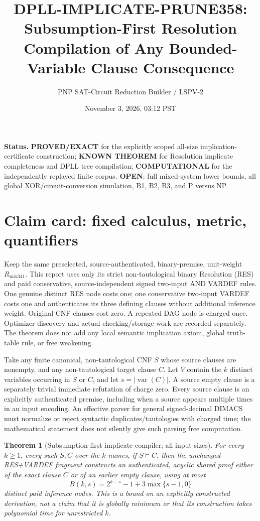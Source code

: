 \documentclass[11pt]{article}
\title{DPLL-IMPLICATE-PRUNE358: Subsumption-First Resolution Compilation of Any Bounded-Variable Clause Consequence}
\author{PNP SAT-Circuit Reduction Builder / LSPV-2}
\date{November 3, 2026, 03:12 PST}
\newtheorem{theorem}{Theorem}
\begin{document}
\maketitle
\noindent\textbf{Status.} \textbf{PROVED/EXACT} for the explicitly scoped all-size implication-certificate construction; \textbf{KNOWN THEOREM} for Resolution implicate completeness and DPLL tree compilation; \textbf{COMPUTATIONAL} for the independently replayed finite corpus. \textbf{OPEN}: full mixed-system lower bounds, all global XOR/circuit-conversion simulation, B1, B2, B3, and P versus NP.

\section*{Claim card: fixed calculus, metric, quantifiers}
Keep the same preselected, source-authenticated, binary-premise, unit-weight $R_{\mathrm{mix341}}$. This report uses only its strict non-tautological binary Resolution (RES) and paid conservative, source-independent signed two-input AND VARDEF rules. One genuine distinct RES node costs one; one conservative two-input VARDEF costs one and authenticates its three defining clauses without additional inference weight. Original CNF clauses cost zero. A repeated DAG node is charged once. Optimizer discovery and actual checking/storage work are recorded separately. The theorem does not add any local semantic implication axiom, global truth-table rule, or free weakening.

Take any finite canonical, non-tautological CNF $S$ whose source clauses are nonempty, and any non-tautological target clause $C$. Let $V$ contain the $k$ distinct variables occurring in $S$ or $C$, and let $s=|\operatorname{var}(C)|$. A source empty clause is a separately trivial immediate refutation of charge zero. Every source clause is an explicitly authenticated premise, including when a source appears multiple times in an input encoding. An effective parser for general signed-decimal DIMACS must normalize or reject syntactic duplicates/tautologies with charged time; the mathematical statement does not silently give such parsing free computation.

\begin{theorem}[Subsumption-first implicate compiler; all input sizes]
For every $k\ge1$, every such $S,C$ over the $k$ names, if $S\models C$, then the unchanged RES+VARDEF fragment constructs an authenticated, acyclic shared proof either of the \emph{exact clause} $C$ or of an earlier empty clause, using at most
\[
\boxed{B(k,s)=2^{k-s}-1+3\max\{s-1,0\}}
\]
distinct paid inference nodes. This is a bound on an explicitly constructed derivation, not a claim that it is globally minimum or that its construction takes polynomial time for unrestricted $k$.
\end{theorem}
\end{document}
